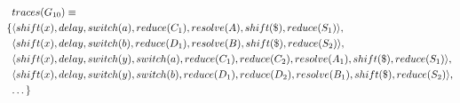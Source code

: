 \documentclass[a4paper,11pt]{article}
\begin{document}
{\small\parbox{.3\textwidth}{\begin{align*}
&traces(G_{10}) \equiv \\
 \{ & \langle shift(x), delay, switch(a), reduce(C_1), resolve(A), shift(\$), reduce(S_1) \rangle,\\
    & \langle shift(x), delay, switch(b), reduce(D_1), resolve(B), shift(\$), reduce(S_2) \rangle,\\
    & \langle shift(x), delay, switch(y), switch(a), reduce(C_1), reduce(C_2), resolve(A_1), shift(\$), reduce(S_1) \rangle,\\
    & \langle shift(x), delay, switch(y), switch(b), reduce(D_1), reduce(D_2), resolve(B_1), shift(\$), reduce(S_2) \rangle,\\
    & \textellipsis \}
\end{align*}}}



\end{document}
